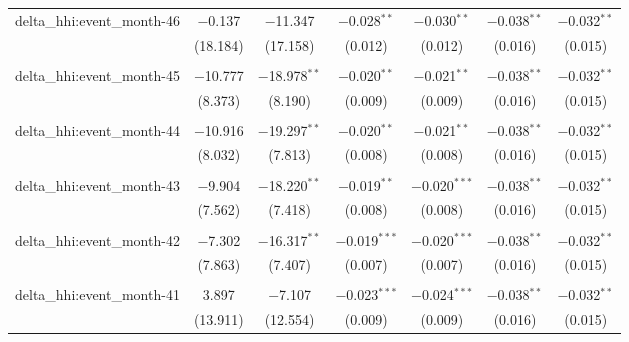 \begin{table}[H]
{\begin{tabular}{@{\extracolsep{5pt}}lcccccc}
  delta\_hhi:event\_month-46 & $-$0.137 & $-$11.347 & $-$0.028$^{**}$ & $-$0.030$^{**}$ & $-$0.038$^{**}$ & $-$0.032$^{**}$ \\  

   & (18.184) & (17.158) & (0.012) & (0.012) & (0.016) & (0.015) \\  

   & & & & & & \\  

  delta\_hhi:event\_month-45 & $-$10.777 & $-$18.978$^{**}$ & $-$0.020$^{**}$ & $-$0.021$^{**}$ & $-$0.038$^{**}$ & $-$0.032$^{**}$ \\  

   & (8.373) & (8.190) & (0.009) & (0.009) & (0.016) & (0.015) \\  

   & & & & & & \\  

  delta\_hhi:event\_month-44 & $-$10.916 & $-$19.297$^{**}$ & $-$0.020$^{**}$ & $-$0.021$^{**}$ & $-$0.038$^{**}$ & $-$0.032$^{**}$ \\  

   & (8.032) & (7.813) & (0.008) & (0.008) & (0.016) & (0.015) \\  

   & & & & & & \\  

  delta\_hhi:event\_month-43 & $-$9.904 & $-$18.220$^{**}$ & $-$0.019$^{**}$ & $-$0.020$^{***}$ & $-$0.038$^{**}$ & $-$0.032$^{**}$ \\  

   & (7.562) & (7.418) & (0.008) & (0.008) & (0.016) & (0.015) \\  

   & & & & & & \\  

  delta\_hhi:event\_month-42 & $-$7.302 & $-$16.317$^{**}$ & $-$0.019$^{***}$ & $-$0.020$^{***}$ & $-$0.038$^{**}$ & $-$0.032$^{**}$ \\  

   & (7.863) & (7.407) & (0.007) & (0.007) & (0.016) & (0.015) \\  

   & & & & & & \\  

  delta\_hhi:event\_month-41 & 3.897 & $-$7.107 & $-$0.023$^{***}$ & $-$0.024$^{***}$ & $-$0.038$^{**}$ & $-$0.032$^{**}$ \\  

   & (13.911) & (12.554) & (0.009) & (0.009) & (0.016) & (0.015) \\  


\end{tabular}}
\end{table}
